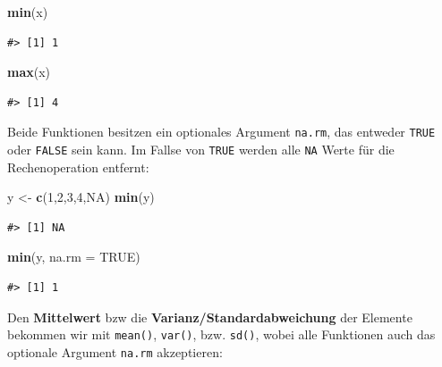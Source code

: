 \documentclass[]{book}
\newenvironment{Shaded}{\begin{snugshade}}{\end{snugshade}}
\newcommand{\KeywordTok}[1]{\textcolor[rgb]{0.13,0.29,0.53}{\textbf{#1}}}
\newcommand{\DataTypeTok}[1]{\textcolor[rgb]{0.13,0.29,0.53}{#1}}
\newcommand{\DecValTok}[1]{\textcolor[rgb]{0.00,0.00,0.81}{#1}}
\newcommand{\StringTok}[1]{\textcolor[rgb]{0.31,0.60,0.02}{#1}}
\newcommand{\OtherTok}[1]{\textcolor[rgb]{0.56,0.35,0.01}{#1}}
\newcommand{\NormalTok}[1]{#1}
\begin{document}
\begin{Shaded}
\begin{Highlighting}[]
\KeywordTok{min}\NormalTok{(x)}
\end{Highlighting}
\end{Shaded}

\begin{verbatim}
#> [1] 1
\end{verbatim}

\begin{Shaded}
\begin{Highlighting}[]
\KeywordTok{max}\NormalTok{(x)}
\end{Highlighting}
\end{Shaded}

\begin{verbatim}
#> [1] 4
\end{verbatim}

Beide Funktionen besitzen ein optionales Argument \texttt{na.rm}, das
entweder \texttt{TRUE} oder \texttt{FALSE} sein kann. Im Fallse von
\texttt{TRUE} werden alle \texttt{NA} Werte für die Rechenoperation
entfernt:

\begin{Shaded}
\begin{Highlighting}[]
\NormalTok{y <-}\StringTok{ }\KeywordTok{c}\NormalTok{(}\DecValTok{1}\NormalTok{,}\DecValTok{2}\NormalTok{,}\DecValTok{3}\NormalTok{,}\DecValTok{4}\NormalTok{,}\OtherTok{NA}\NormalTok{)}
\KeywordTok{min}\NormalTok{(y)}
\end{Highlighting}
\end{Shaded}

\begin{verbatim}
#> [1] NA
\end{verbatim}

\begin{Shaded}
\begin{Highlighting}[]
\KeywordTok{min}\NormalTok{(y, }\DataTypeTok{na.rm =} \OtherTok{TRUE}\NormalTok{)}
\end{Highlighting}
\end{Shaded}

\begin{verbatim}
#> [1] 1
\end{verbatim}

Den \textbf{Mittelwert} bzw die \textbf{Varianz/Standardabweichung} der
Elemente bekommen wir mit \texttt{mean()}, \texttt{var()}, bzw.
\texttt{sd()}, wobei alle Funktionen auch das optionale Argument
\texttt{na.rm} akzeptieren:
\end{document}
